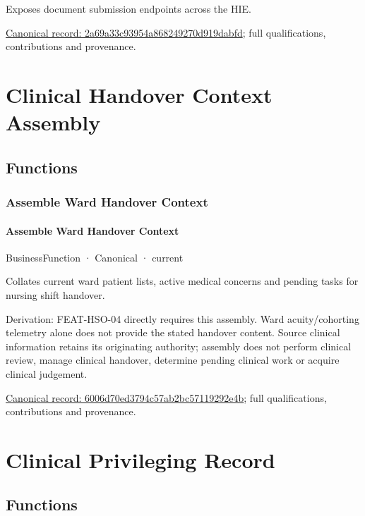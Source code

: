 Exposes document submission endpoints across the HIE.


{\footnotesize \href{../../../../continuum/business/business-service/2a69a33c93954a868249270d919dabfd.md}{Canonical record: 2a69a33c93954a868249270d919dabfd}; full qualifications, contributions and provenance.}\par
\section{Clinical Handover Context Assembly}

\subsection{Functions}

\subsubsection{Assemble Ward Handover Context}

\paragraph{Assemble Ward Handover Context}

\label{element:6006d70ed3794c57ab2bc57119292e4b}
{\small BusinessFunction · Canonical · current}\par

Collates current ward patient lists, active medical concerns and pending tasks for nursing shift handover.



Derivation: FEAT-HSO-04 directly requires this assembly. Ward acuity/cohorting telemetry alone does not provide the stated handover content. Source clinical information retains its originating authority; assembly does not perform clinical review, manage clinical handover, determine pending clinical work or acquire clinical judgement.


{\footnotesize \href{../../../../continuum/business/business-function/6006d70ed3794c57ab2bc57119292e4b.md}{Canonical record: 6006d70ed3794c57ab2bc57119292e4b}; full qualifications, contributions and provenance.}\par
\section{Clinical Privileging Record}

\subsection{Functions}

